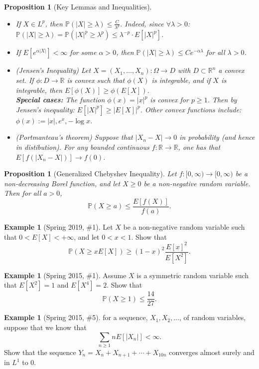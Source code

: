 \documentclass[12pt,reqno]{article}
\renewcommand{\emph}[1]{\textit{#1}}
\theoremstyle{plain}
\newtheorem{prop}[theorem]{Proposition}
\theoremstyle{definition}
\newtheorem{example}[theorem]{Example}
\newcommand{\PP}[1]{\ensuremath{\mathbb{P}\left(#1\right)}}
\begin{document}
\begin{prop}[Key Lemmas and Inequalities]
\begin{itemize}
\item[(D)] If $X \in L^p$, then 
     $\mathbb{P}(|X| \geq \lambda) \leq \frac{C}{\lambda^p}$. Indeed, 
     since $\forall \lambda > 0$: 
     $\mathbb{P}(|X| \geq \lambda) = \mathbb{P}(|X|^p \geq \lambda^p) \leq 
     \lambda^{-p} \cdot E[|X|^p]$. 
\item[(E)] If $E[e^{\alpha |X|}] < \infty$ for some $\alpha > 0$, then 
     $\mathbb{P}(|X| \geq \lambda) \leq C e^{-\alpha\lambda}$ for all 
     $\lambda > 0$. 
\item[(F)] (\emph{Jensen's Inequality}) 
     Let $X = (X_1,\ldots,X_n): \Omega \rightarrow D$ with 
     $D \subset \mathbb{R}^n$ a convex set. If 
     $\phi: D \rightarrow \mathbb{R}$ is convex such that 
     $\phi(X)$ is integrable, and if $X$ is integrable, then 
     $E[\phi(X)] \geq \phi(E[X])$. \\ 
     \textbf{Special cases:} The function $\phi(x) = |x|^p$ is convex for 
     $p \geq 1$. Then by Jensen's inequality: 
     $E[|X|^p] \geq |E[X]|^p$. Other convex functions include: 
     $\phi(x) := |x|, e^x, -\log x$. 
\item[(G)] (\emph{Portmanteau's theorem}) 
     Suppose that $|X_n-X| \rightarrow 0$ in probability (and hence in 
     distibution). 
     For any bounded continuous 
     $f: \mathbb{R} \rightarrow \mathbb{R}$, one has that 
     $E[f(|X_n-X|)] \rightarrow f(0)$. 
\end{itemize} 
\end{prop} 

\begin{prop}[Generalized Chebyshev Inequality]
Let $f: [0, \infty) \rightarrow [0, \infty)$ be a non-decreasing Borel function, and 
let $X \geq 0$ be a non-negative random variable. Then for all $a > 0$, 
\[
\PP{X \geq a} \leq \frac{E[f(X)]}{f(a)}. 
\]
\end{prop} 

\begin{example}[Spring 2019, \#1]
Let $X$ be a non-negative random variable such that $0 < E[X] < +\infty$, and 
let $0 < x < 1$. Show that 
\[
\PP{X \geq x E[X]} \geq (1-x)^2 \frac{E[x]^2}{E[X^2]}. 
\]
\end{example} 

\begin{example}[Spring 2015, \#1]
Assume $X$ is a symmetric random variable such that $E[X^2] = 1$ and 
$E[X^4] = 2$. Show that 
\[
\PP{X \geq 1} \leq \frac{14}{27}.
\]
\end{example} 

\begin{example}[Spring 2015, \#5]
for a sequence, $X_1,X_2,\ldots$, of random variables, suppose that we 
know that 
\[
\sum_{n \geq 1} n E[|X_n|] < \infty. 
\]
Show that the sequence $Y_n = X_n + X_{n+1}+\cdots+X_{10n}$ converges 
almost surely and in $L^1$ to $0$. 
\end{example} 
\end{document}
